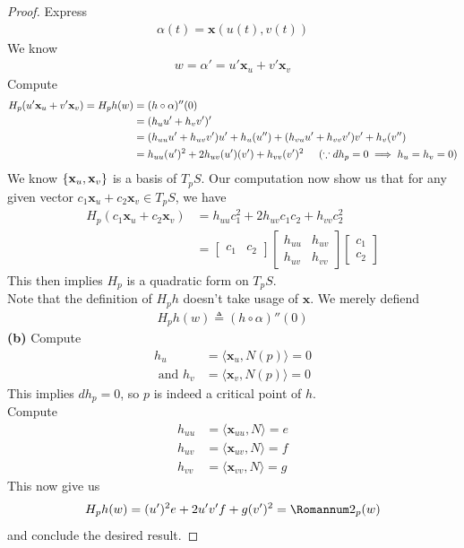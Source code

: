 \documentclass{report}
\begin{document}
\begin{proof}
Express 
\begin{align*}
\alpha (t)=\textbf{x}(u(t),v(t))
\end{align*}
We know 
\begin{align*}
w=\alpha '= u' \textbf{x}_u + v' \textbf{x}_v
\end{align*}
Compute 
\begin{align*}
H_p(u'\textbf{x}_u + v' \textbf{x}_v)=H_ph(w)&= (h\circ \alpha )''(0)\\
&=(h_uu'+h_vv')'\\
&=(h_{uu}u'+h_{uv}v')u'+ h_u(u'') +(h_{vu}u'+ h_{vv}v')v'+ h_v (v'')\\
&=h_{uu}(u')^2 + 2h_{uv} (u')(v') + h_{vv}(v')^2\hspace{0.5cm}(\because dh_p=0\implies h_u=h_v=0)
\end{align*}
We know $\{ \textbf{x}_u ,\textbf{x}_v  \}$ is a basis of $T_pS$. Our computation now show us that for any given vector $c_1\textbf{x}_u+c_2\textbf{x}_v\in T_pS$, we have
\begin{align*}
H_p(c_1\textbf{x}_u+c_2\textbf{x}_v)&=h_{uu}c_1^2+ 2h_{uv}c_1c_2+ h_{vv}c_2^2\\
&=\begin{bmatrix}
  c_1 & c_2
\end{bmatrix} \begin{bmatrix}
  h_{uu} & h_{uv}\\
  h_{uv} & h_{vv}
\end{bmatrix}\begin{bmatrix}
c_1\\
c_2
\end{bmatrix}
\end{align*}
This then implies $H_p$ is a quadratic form on  $T_pS$.\\

Note that the definition of  $H_ph$ doesn't take usage of  $\textbf{x}$. We merely defiend 
\begin{align*}
H_ph(w)\triangleq (h\circ \alpha )''(0)
\end{align*}
\textbf{(b)}
Compute 
\begin{align*}
h_u&=\langle \textbf{x}_u ,N(p)\rangle =0\\
\text{ and }h_v&=\langle \textbf{x}_v, N(p)\rangle =0
\end{align*}
This implies  $dh_p=0$, so $p$ is indeed a critical point of $h$.\\

Compute 
\begin{align*}
h_{uu}&=\langle \textbf{x}_{uu}, N\rangle =e \\
h_{uv}&=\langle \textbf{x}_{uv},N\rangle =f \\
h_{vv}&=\langle \textbf{x}_{vv},N\rangle =g 
\end{align*}
This now give us 
\begin{align*}
H_ph(w)=(u')^2e+2u'v'f+g(v')^2=\Sec_p(w)
\end{align*}
and conclude the desired result. 



\end{proof}
\end{document}
